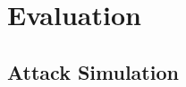 
\section{Evaluation}
\label{sec:evaluation}

\textcolor{dimgray}{\lipsum[1-15]}


\subsection{Attack Simulation}
\label{subsec:attack-simulation}

\textcolor{dimgray}{\lipsum[1-20]}
